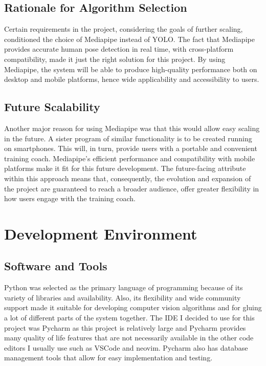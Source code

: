     \subsection{Rationale for Algorithm Selection}
        Certain requirements in the project, considering the goals of further scaling, conditioned the choice of Mediapipe instead of YOLO. The fact that Mediapipe provides accurate human pose detection in real time, with cross-platform compatibility, made it just the right solution for this project. By using Mediapipe, the system will be able to produce high-quality performance both on desktop and mobile platforms, hence wide applicability and accessibility to users.
    \subsection{Future Scalability}
        Another major reason for using Mediapipe was that this would allow easy scaling in the future. A sister program of similar functionality is to be created running on smartphones. This will, in turn, provide users with a portable and convenient training coach. Mediapipe's efficient performance and compatibility with mobile platforms make it fit for this future development. The future-facing attribute within this approach means that, consequently, the evolution and expansion of the project are guaranteed to reach a broader audience, offer greater flexibility in how users engage with the training coach.
\section{Development Environment}
    \subsection{Software and Tools}
        Python was selected as the primary language of programming because of its variety of libraries and availability. Also, its flexibility and wide community support made it suitable for developing computer vision algorithms and for gluing a lot of different parts of the system together. The IDE I decided to use for this project was Pycharm as this project is relatively large and Pycharm provides many quality of life features that are not necessarily available in the other code editors I usually use such as VSCode and neovim. Pycharm also has database management tools that allow for easy implementation and testing. 


